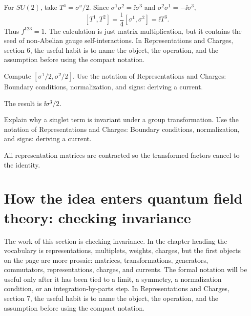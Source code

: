 \begin{example}
For \(SU(2)\), take \(T^a=\sigma^a/2\).  Since \(\sigma^1\sigma^2=\ii\sigma^3\) and \(\sigma^2\sigma^1=-\ii\sigma^3\),
\[
  [T^1,T^2]=\frac14[\sigma^1,\sigma^2]=\ii T^3.
\]
Thus \(f^{123}=1\).  The calculation is just matrix multiplication, but it contains the seed of non-Abelian gauge self-interactions.  In Representations and Charges, section 6, the useful habit is to name the object, the operation, and the assumption before using the compact notation.
\end{example}



\begin{exercise}
Compute \([\sigma^1/2,\sigma^2/2]\).  Use the notation of Representations and Charges: Boundary conditions, normalization, and signs: deriving a current.
\begin{answer}
The result is \(\ii\sigma^3/2\).
\end{answer}
\end{exercise}

\begin{exercise}
Explain why a singlet term is invariant under a group transformation.  Use the notation of Representations and Charges: Boundary conditions, normalization, and signs: deriving a current.
\begin{answer}
All representation matrices are contracted so the transformed factors cancel to the identity.
\end{answer}
\end{exercise}



\section{How the idea enters quantum field theory: checking invariance}

The work of this section is checking invariance.  In the chapter heading the vocabulary is representations, multiplets, weights, charges, but the first objects on the page are more prosaic: matrices, transformations, generators, commutators, representations, charges, and currents.  The formal notation will be useful only after it has been tied to a limit, a symmetry, a normalization condition, or an integration-by-parts step.  In Representations and Charges, section 7, the useful habit is to name the object, the operation, and the assumption before using the compact notation.

